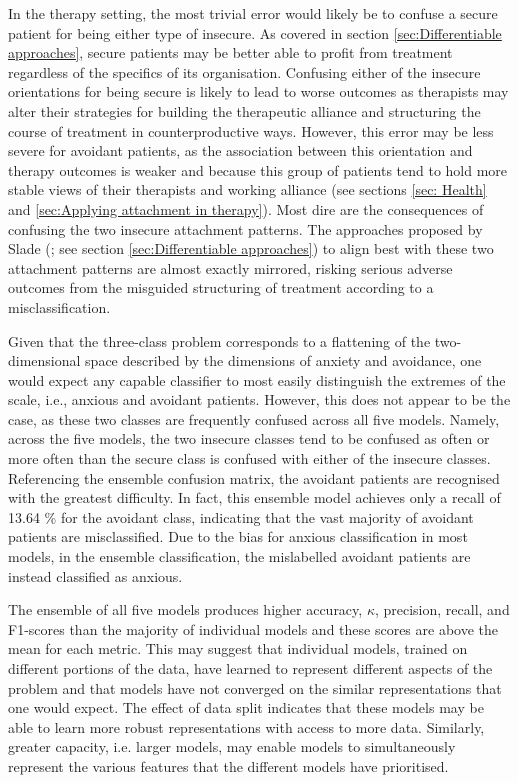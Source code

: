 \documentclass[12pt]{report}
\begin{document}
In the therapy setting, the most trivial error would likely be to confuse a secure patient for being either type of insecure.
As covered in section \ref{sec:Differentiable approaches}, secure patients may be better able to profit from treatment regardless of the specifics of its organisation.
Confusing either of the insecure orientations for being secure is likely to lead to worse outcomes as therapists may alter their strategies for building the therapeutic alliance and structuring the course of treatment in counterproductive ways.
However, this error may be less severe for avoidant patients, as the association between this orientation and therapy outcomes is weaker and because this group of patients tend to hold more stable views of their therapists and working alliance (see sections \ref{sec: Health} and \ref{sec:Applying attachment in therapy}).
Most dire are the consequences of confusing the two insecure attachment patterns.
The approaches proposed by Slade (; see section \ref{sec:Differentiable approaches}) to align best with these two attachment patterns are almost exactly mirrored, risking serious adverse outcomes from the misguided structuring of treatment according to a misclassification.

Given that the three-class problem corresponds to a flattening of the two-dimensional space described by the dimensions of anxiety and avoidance, one would expect any capable classifier to most easily distinguish the extremes of the scale, i.e., anxious and avoidant patients.
However, this does not appear to be the case, as these two classes are frequently confused across all five models.
Namely, across the five models, the two insecure classes tend to be confused as often or more often than the secure class is confused with either of the insecure classes.
Referencing the ensemble confusion matrix, the avoidant patients are recognised with the greatest difficulty.
In fact, this ensemble model achieves only a recall of 13.64 \% for the avoidant class, indicating that the vast majority of avoidant patients are misclassified.
Due to the bias for anxious classification in most models, in the ensemble classification, the mislabelled avoidant patients are instead classified as anxious.

The ensemble of all five models produces higher accuracy, $\kappa$, precision, recall, and F1-scores than the majority of individual models and these scores are above the mean for each metric.
This may suggest that individual models, trained on different portions of the data, have learned to represent different aspects of the problem and that models have not converged on the similar representations that one would expect.
The effect of data split indicates that these models may be able to learn more robust representations with access to more data.
Similarly, greater capacity, i.e. larger models, may enable models to simultaneously represent the various features that the different models have prioritised.
\end{document}
